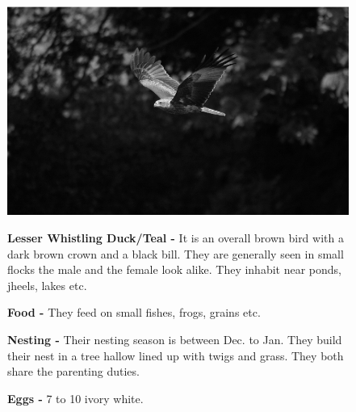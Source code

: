 \begin{figure}[H]
\begin{center}
\includegraphics{figure/Land_birds/01_pariah_kite/pariah-kite.eps}
\end{center}
\medskip
\noindent
{\bf Lesser Whistling Duck/Teal -} It is an overall brown bird with a dark brown crown and a black bill. They are generally seen in small flocks the male and the female look alike. They inhabit near ponds, jheels, lakes etc. 

\medskip
{\bf Food -} They feed on small fishes, frogs, grains etc.

{\bf Nesting -} Their nesting season is between Dec. to Jan. They build their nest in a tree hallow lined up with twigs and grass. They both share the parenting duties.

{\bf Eggs -} 7 to 10 ivory white.
\end{figure}

\vfill\eject

~\phantom{a}
\vfill

